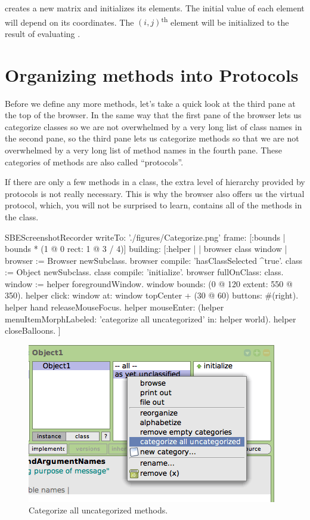 \documentclass[a4paper,10pt,twoside]{book}
\begin{document}
 creates a new  matrix and initializes its elements.
The initial value of each element will depend on its coordinates.
The {$(i,j)$}\textsuperscript{th} element will be initialized to the result of evaluating .

\section{Organizing methods into Protocols}

Before we define any more methods, let's take a quick look at the third pane at the top of the browser.
In the same way that the first pane of the browser lets us categorize classes so we are not overwhelmed by a very long list of class names in the second pane, so the third pane lets us categorize methods so that we are not overwhelmed by a very long list of method names in the fourth pane.  
These categories of methods are also called ``protocols''.

If there are only a few methods in a class, the extra level of hierarchy provided by protocols is not really necessary.
This is why the browser also offers us the  virtual protocol, which, you will not be surprised to learn, contains all of the methods in the class.

\begin{ExecuteSmalltalkScript}
SBEScreenshotRecorder writeTo: './figures/Categorize.png' frame: [:bounds | bounds * (1 @ 0 rect: 1 @ 3 / 4)] building: [:helper |
	| browser class window |
  browser := Browser newSubclass.
  browser compile: 'hasClassSelected ^true'.
  class := Object newSubclass.
  class compile: 'initialize'.
  browser fullOnClass: class.
  window := helper foregroundWindow.
  window bounds: (0 @ 120 extent: 550 @ 350).
  helper click: window at: window topCenter + (30 @ 60) buttons: #(right).
  helper hand releaseMouseFocus.
  helper mouseEnter: (helper menuItemMorphLabeled: 'categorize all uncategorized' in: helper world).
  helper closeBalloons.
]
\end{ExecuteSmalltalkScript}
\begin{figure}[htbp]
   \centering
   \includegraphics[scale=0.65]{Categorize} 
   \caption{Categorize all uncategorized methods.\label{fig:categorize}}
\end{figure}
\end{document}

